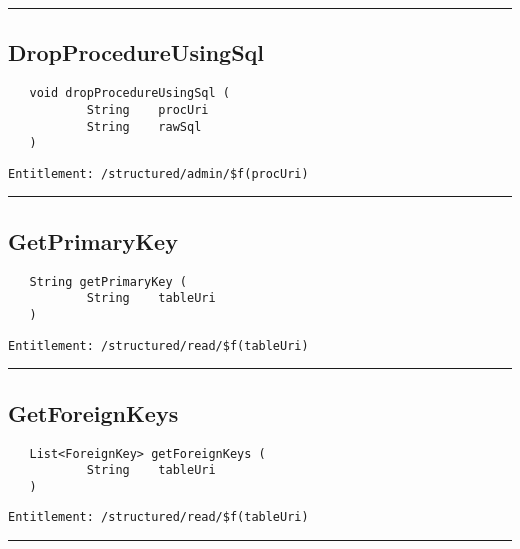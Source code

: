 \rule{12cm}{2pt}
\subsection{DropProcedureUsingSql}
\label{Api:DropProcedureUsingSql}
\begin{verbatim}
   void dropProcedureUsingSql (
           String    procUri
           String    rawSql
   )
\end{verbatim}
\begin{Verbatim}[fontsize=\small, formatcom=\color{Maroon}]
  Entitlement: /structured/admin/$f(procUri)
\end{Verbatim}



\rule{12cm}{2pt}
\subsection{GetPrimaryKey}
\label{Api:GetPrimaryKey}
\begin{verbatim}
   String getPrimaryKey (
           String    tableUri
   )
\end{verbatim}
\begin{Verbatim}[fontsize=\small, formatcom=\color{Maroon}]
  Entitlement: /structured/read/$f(tableUri)
\end{Verbatim}



\rule{12cm}{2pt}
\subsection{GetForeignKeys}
\label{Api:GetForeignKeys}
\begin{verbatim}
   List<ForeignKey> getForeignKeys (
           String    tableUri
   )
\end{verbatim}
\begin{Verbatim}[fontsize=\small, formatcom=\color{Maroon}]
  Entitlement: /structured/read/$f(tableUri)
\end{Verbatim}



\rule{12cm}{2pt}
